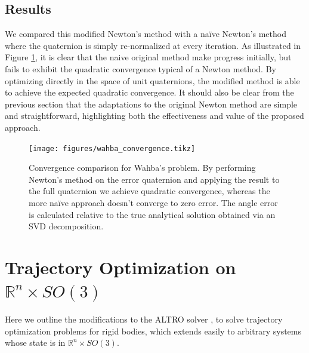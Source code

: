 \documentclass[letterpaper, 10 pt, conference]{ieeeconf}  %
\newcommand{\R}{\mathbb{R}}
\begin{document}
    \subsection{Results}
    We compared this modified Newton's method with a na\"ive Newton's method where the quaternion is simply re-normalized at every iteration. 
    As illustrated in Figure \ref{fig:wahba_convergence}, it is clear that the naive original method make progress initially, but fails to
    exhibit the quadratic convergence typical of a Newton method. By optimizing directly 
    in the space of unit quaternions, the modified method is able to achieve the expected quadratic convergence.
    It should also be clear from the previous section that the adaptations to the original
    Newton method are simple and straightforward, highlighting both the effectiveness and
    value of the proposed approach.
    \begin{figure}

        \centering
        \texttt{[image: figures/wahba\_convergence.tikz]}
        \caption{Convergence comparison for Wahba's problem. By performing Newton's method
        on the error quaternion and applying the result to the full quaternion we achieve
        quadratic convergence, whereas the more na\"ive approach doesn't converge to zero
        error. The angle error is calculated relative to the true analytical solution obtained
        via an SVD decomposition.}
        \label{fig:wahba_convergence}
    \end{figure}

\section{Trajectory Optimization on $\R^n \times SO(3)$} \label{sec:trajopt}
    Here we outline the modifications to the ALTRO solver \cite{howell2019altro}, to
    solve trajectory optimization problems for rigid bodies, which extends easily to
    arbitrary systems whose state is in $\R^n \times SO(3)$. %
\end{document}
